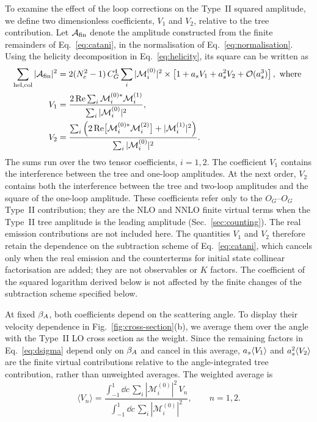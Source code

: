 To examine the effect of the loop corrections on the Type~II squared amplitude, we define two dimensionless
coefficients, $V_1$ and $V_2$, relative to the tree contribution. Let $\mathcal A_{\mathrm{fin}}$ denote the
amplitude constructed from the finite remainders of Eq.~\eqref{eq:catani}, in the normalisation of
Eq.~\eqref{eq:normalisation}. Using the helicity decomposition in Eq.~\eqref{eq:helicity}, its square
can be written as
\begin{align}
 \sum_{\mathrm{hel,col}}|\mathcal A_{\mathrm{fin}}|^2
 &=2(N_c^2-1)\,C_G^4
   \sum_i|\mathcal M_i^{(0)}|^2
 \times
 \left[1+a_s V_1+a_s^2V_2+\mathcal{O}(a_s^3)\right], \text{ where }
 \nonumber\\
 V_1
 &=\frac{
  2\operatorname{Re}\sum_i
  \mathcal M_i^{(0)*}\mathcal M_i^{(1)}
 }{
  \sum_i|\mathcal M_i^{(0)}|^2
 },
 \nonumber\\
 V_2
 &=\frac{
  \sum_i\left(
   2\operatorname{Re}\bigl[\mathcal M_i^{(0)*}\mathcal{M}^{(2)}_{i}\bigr]
   +|\mathcal M_i^{(1)}|^2
  \right)
 }{
  \sum_i|\mathcal M_i^{(0)}|^2
 }.
 \label{eq:virtual}
\end{align}
The sums run over the two tensor coefficients, $i=1,2$. The coefficient $V_1$ contains the
interference between the tree and one-loop amplitudes. At the next order, $V_2$ contains
both the interference between the tree and two-loop amplitudes and the square of the
one-loop amplitude.
These coefficients refer only to the $O_G$--$O_G$ Type~II contribution; they are the NLO and NNLO finite virtual terms when the Type~II tree amplitude is the leading amplitude (Sec.~\ref{sec:counting}).
The real emission contributions are not included here. The quantities
$V_1$ and $V_2$ therefore retain the dependence on the subtraction scheme
of Eq.~\eqref{eq:catani}, which cancels only when the real emission and the
counterterms for initial state collinear factorisation are added; they are
not observables or $K$ factors. The coefficient of the squared logarithm derived below is not affected by the finite changes of the subtraction scheme specified below.

At fixed $\beta_A$, both coefficients depend on the scattering angle. To display
their velocity dependence in Fig.~\ref{fig:cross-section}(b), we average them
over the angle with the Type~II LO cross section as the weight. Since the
remaining factors in Eq.~\eqref{eq:dsigma} depend only on $\beta_A$ and cancel
in this average, $a_s\langle V_1\rangle$ and $a_s^2\langle V_2\rangle$ are
the finite virtual contributions relative to the angle-integrated tree
contribution, rather than unweighted averages. The weighted average is
\begin{equation}
 \langle V_n\rangle
 =
 \frac{
  \displaystyle
  \int_{-1}^{1}\dd c\,
  \sum_i|\mathcal M_i^{(0)}|^2\,V_n
 }{
  \displaystyle
  \int_{-1}^{1}\dd c\,
  \sum_i|\mathcal M_i^{(0)}|^2
 },
 \qquad n=1,2.
 \label{eq:angle-average}
\end{equation}

